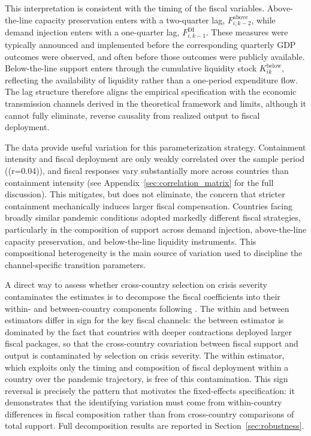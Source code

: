 \documentclass[12pt, a4paper]{article}
\begin{document}
This interpretation is consistent with the timing of the fiscal variables.
Above-the-line capacity preservation enters with a two-quarter lag,
$F^{\text{above}}_{i,k-2}$, while demand injection enters with a one-quarter
lag, $F^{\text{DI}}_{i,k-1}$. These measures were typically announced and
implemented before the corresponding quarterly GDP outcomes were observed, and
often before those outcomes were publicly available. Below-the-line support
enters through the cumulative liquidity stock $K^{\text{below}}_{ik}$,
reflecting the availability of liquidity rather than a one-period expenditure
flow. The lag structure therefore aligns the empirical specification with the
economic transmission channels derived in the theoretical framework and limits,
although it cannot fully eliminate, reverse causality from realized output to
fiscal deployment.

The data provide useful variation for this parameterization strategy. Containment intensity and fiscal deployment are only weakly correlated over the sample period ((r=0.04)), and fiscal responses vary substantially more across countries than containment intensity (see Appendix~\ref{sec:correlation_matrix} for the full discussion). This mitigates, but does not eliminate, the concern that stricter containment mechanically induces larger fiscal compensation. Countries facing broadly similar pandemic conditions adopted markedly different fiscal strategies, particularly in the composition of support across demand injection, above-the-line capacity preservation, and below-the-line liquidity instruments. This compositional heterogeneity is the main source of variation used to discipline the channel-specific transition parameters.

A direct way to assess whether cross-country selection on crisis severity
contaminates the estimates is to decompose the fiscal coefficients into their
within- and between-country components following \citet{mundlak1978}. The
within and between estimators differ in sign for the key fiscal channels: the
between estimator is dominated by the fact that countries with deeper
contractions deployed larger fiscal packages, so that the cross-country
covariation between fiscal support and output is contaminated by selection on
crisis severity. The within estimator, which exploits only the
timing and composition of fiscal deployment within a country over the pandemic
trajectory, is free of this contamination. This sign reversal is precisely the
pattern that motivates the fixed-effects specification: it demonstrates that the
identifying variation must come from within-country differences in fiscal
composition rather than from cross-country comparisons of total support. Full
decomposition results are reported in Section~\ref{sec:robustness}.
\end{document}
